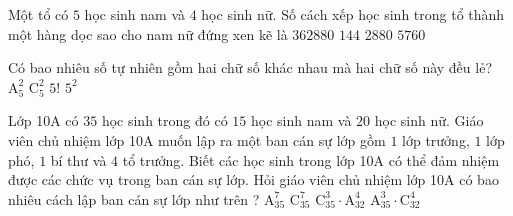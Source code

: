 \begin{ex}%
	Một tổ có $5$ học sinh nam và $4$ học sinh nữ. Số cách xếp học sinh trong tổ thành một hàng dọc sao cho nam nữ đứng xen kẽ là
	\choice
	{ $362880$}
	{ $144$}
	{\True $2880$}
	{ $5760$}
\end{ex}
\begin{ex}%
	Có bao nhiêu số tự nhiên gồm hai chữ số khác nhau mà hai chữ số này đều lẻ?
	\choice
	{\True $\mathrm{A}_5^2$}
	{ $\mathrm{C}_5^2$}
	{ $5!$}
	{ $5^2$}
\end{ex}
\begin{ex}%
	Lớp 10A có $35$ học sinh trong đó có $15$ học sinh nam và $20$ học sinh nữ. Giáo viên chủ nhiệm lớp 10A muốn lập ra một ban cán sự lớp gồm $1$ lớp trưởng, $1$ lớp phó, $1$ bí thư và $4$ tổ trưởng. Biết các học sinh trong lớp 10A có thể đảm nhiệm được các chức vụ trong ban cán sự lớp. Hỏi giáo viên chủ nhiệm lớp 10A có bao nhiêu cách lập ban cán sự lớp như trên ?
	\choice
	{ $\mathrm{A}_{35}^7$}
	{ $\mathrm{C}_{35}^7$}
	{ $\mathrm{C}_{35}^3\cdot\mathrm{A}_{32}^4$}
	{\True $\mathrm{A}_{35}^3\cdot\mathrm{C}_{32}^4$}
\end{ex}


